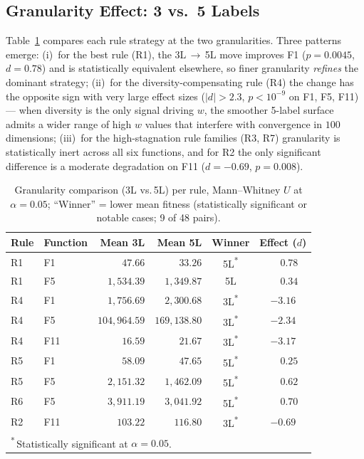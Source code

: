 \documentclass[runningheads]{llncs}
\begin{document}
\subsection{Granularity Effect: 3 vs.\ 5 Labels}\label{sec:granularity}

Table~\ref{tab:granularity} compares each rule strategy at the two granularities. Three patterns emerge: (i)~for the best rule (R1), the 3L\,$\to$\,5L move improves F1 ($p=0.0045$, $d=0.78$) and is statistically equivalent elsewhere, so finer granularity \emph{refines} the dominant strategy; (ii)~for the diversity-compensating rule (R4) the change has the opposite sign with very large effect sizes ($|d|>2.3$, $p<10^{-9}$ on F1, F5, F11) --- when diversity is the only signal driving $w$, the smoother 5-label surface admits a wider range of high $w$ values that interfere with convergence in $100$ dimensions; (iii)~for the high-stagnation rule families (R3, R7) granularity is statistically inert across all six functions, and for R2 the only significant difference is a moderate degradation on F11 ($d=-0.69$, $p=0.008$).

\begin{table}[b]
\scriptsize
\caption{Granularity comparison (3L vs.\,5L) per rule, Mann--Whitney $U$ at $\alpha=0.05$; ``Winner'' = lower mean fitness (statistically significant or notable cases; 9 of 48 pairs).}\label{tab:granularity}
\centering
\begin{tabular}{ll rr cc}
\toprule
Rule & Function & Mean 3L & Mean 5L & Winner & Effect ($d$) \\
\midrule
R1 & F1  & $47.66$       & $33.26$       & 5L\textsuperscript{*}  & $\phantom{-}0.78$ \\
R1 & F5  & $1{,}534.39$  & $1{,}349.87$  & 5L                     & $\phantom{-}0.34$ \\
R4 & F1  & $1{,}756.69$  & $2{,}300.68$  & 3L\textsuperscript{*}  & $-3.16$ \\
R4 & F5  & $104{,}964.59$& $169{,}138.80$& 3L\textsuperscript{*}  & $-2.34$ \\
R4 & F11 & $16.59$       & $21.67$       & 3L\textsuperscript{*}  & $-3.17$ \\
R5 & F1  & $58.09$       & $47.65$       & 5L\textsuperscript{*}  & $\phantom{-}0.25$ \\
R5 & F5  & $2{,}151.32$  & $1{,}462.09$  & 5L\textsuperscript{*}  & $\phantom{-}0.62$ \\
R6 & F5  & $3{,}911.19$  & $3{,}041.92$  & 5L\textsuperscript{*}  & $\phantom{-}0.70$ \\
R2 & F11 & $103.22$      & $116.80$      & 3L\textsuperscript{*}  & $-0.69$ \\
\bottomrule
\multicolumn{6}{l}{\footnotesize \textsuperscript{*}\,Statistically significant at $\alpha=0.05$.}
\end{tabular}
\end{table}
\end{document}
